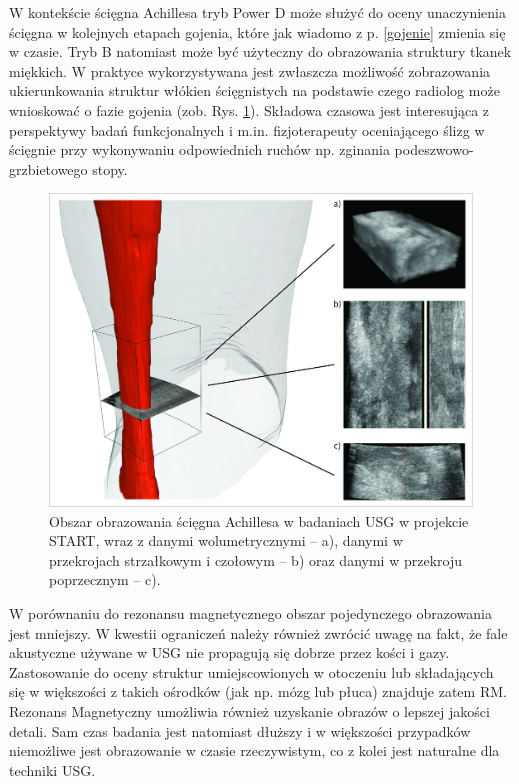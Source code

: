 W kontekście ścięgna Achillesa tryb Power D może służyć do oceny unaczynienia ścięgna w kolejnych etapach gojenia, które jak wiadomo z p. \ref{gojenie} zmienia się w czasie. Tryb B natomiast może być użyteczny do obrazowania struktury tkanek miękkich. W praktyce wykorzystywana jest zwłaszcza możliwość zobrazowania ukierunkowania struktur włókien ścięgnistych na podstawie czego radiolog może wnioskować o fazie gojenia (zob. Rys. \ref{usgAchillesComp}). Składowa czasowa jest interesująca z perspektywy badań funkcjonalnych i m.in. fizjoterapeuty oceniającego ślizg w ścięgnie przy wykonywaniu odpowiednich ruchów np. zginania podeszwowo-grzbietowego stopy. 

\begin{figure}[h!]
	\centering
	\includegraphics[width=1\textwidth]{figures/sciegnoUSG.jpg}
	\caption{Obszar obrazowania ścięgna Achillesa w badaniach USG w projekcie START, wraz z danymi wolumetrycznymi -- a), danymi w przekrojach strzałkowym i czołowym -- b) oraz danymi w przekroju poprzecznym -- c).}
	\label{usgAchillesComp}
\end{figure}

\newpage
W porównaniu do rezonansu magnetycznego obszar pojedynczego obrazowania jest mniejszy. W kwestii ograniczeń należy również zwrócić uwagę na fakt, że fale akustyczne używane w USG nie propagują się dobrze przez kości i gazy. Zastosowanie do oceny struktur umiejscowionych w otoczeniu lub składających się w większości \linebreak z takich ośrodków (jak np. mózg lub płuca) znajduje zatem RM. Rezonans Magnetyczny umożliwia również uzyskanie obrazów o lepszej jakości detali. Sam czas badania jest natomiast dłuższy i w większości przypadków niemożliwe jest obrazowanie w czasie rzeczywistym, co z kolei jest naturalne dla techniki USG.

